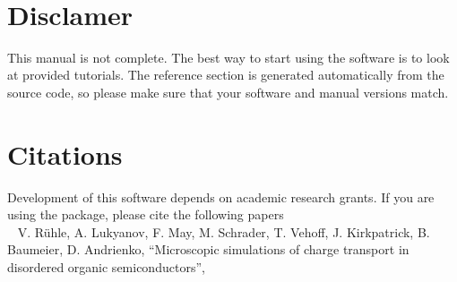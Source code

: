 \begin{titlepage}


\vspace*{1cm}

\vspace*{3cm}
\vspace*{1cm}
\vfill

\vspace*{0.5cm}
\center{\large{\today}} \\
\vspace*{0.3cm}
\end{titlepage}

\section*{Disclamer}
This manual is not complete. The best way to start using the software is to look at provided tutorials. The reference section is generated automatically from the source code, so please make sure that your software and manual versions match.  

\section*{Citations}
Development of this software depends on academic research grants. If you are using the package, please cite the  following papers \\

\vspace{0.1cm}
\noindent
~\cite{ruhle_microscopic_2011} V. R\"uhle, A. Lukyanov, F. May, M. Schrader, T. Vehoff, J. Kirkpatrick, B. Baumeier, D. Andrienko,
``Microscopic simulations of charge transport in disordered organic semiconductors'',  \\


